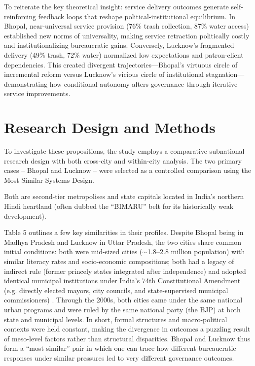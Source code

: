 To reiterate the key theoretical insight: service delivery outcomes generate self-reinforcing feedback loops that reshape political-institutional equilibrium. In Bhopal, near-universal service provision (76\% trash collection, 87\% water access) established new norms of universality, making service retraction politically costly and institutionalizing bureaucratic gains. Conversely, Lucknow's fragmented delivery (49\% trash, 72\% water) normalized low expectations and patron-client dependencies. This created divergent trajectories—Bhopal's virtuous circle of incremental reform versus Lucknow's vicious circle of institutional stagnation—demonstrating how conditional autonomy alters governance through iterative service improvements.

\section{Research Design and Methods}

To investigate these propositions, the study employs a comparative subnational research design with both cross-city and within-city analysis. The two primary cases – Bhopal and Lucknow – were selected as a controlled comparison using the Most Similar Systems Design.

Both are second-tier metropolises and state capitals located in India's northern Hindi heartland (often dubbed the ``BIMARU'' belt for its historically weak development).

Table 5 outlines a few key similarities in their profiles. Despite Bhopal being in Madhya Pradesh and Lucknow in Uttar Pradesh, the two cities share common initial conditions: both were mid-sized cities ($\sim$1.8–2.8 million population) with similar literacy rates and socio-economic compositions; both had a legacy of indirect rule (former princely states integrated after independence) and adopted identical municipal institutions under India's 74th Constitutional Amendment (e.g. directly elected mayors, city councils, and state-supervised municipal commissioners) . Through the 2000s, both cities came under the same national urban programs and were ruled by the same national party (the BJP) at both state and municipal levels. In short, formal structures and macro-political contexts were held constant, making the divergence in outcomes a puzzling result of meso-level factors rather than structural disparities. Bhopal and Lucknow thus form a ``most-similar'' pair in which one can trace how different bureaucratic responses under similar pressures led to very different governance outcomes.

